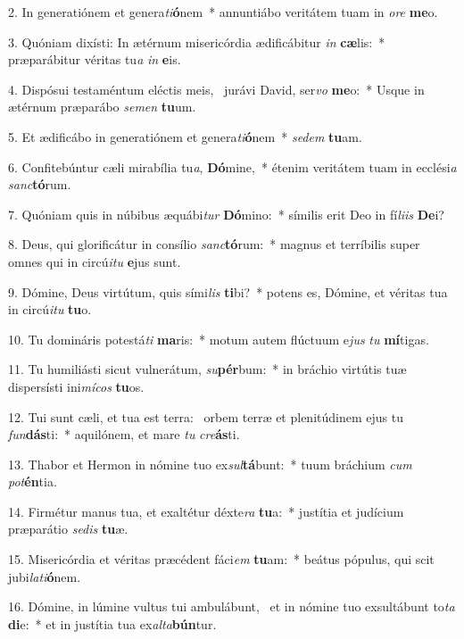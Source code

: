 2. In generatiónem et genera\textit{ti}\textbf{ó}nem~*  annuntiábo veritátem tuam in \textit{o}\textit{re} \textbf{me}o.\

3. Quóniam dixísti: In ætérnum misericórdia ædificábitur \textit{in} \textbf{cæ}lis:~*  præparábitur véritas tu\textit{a} \textit{in} \textbf{e}is.\

4. Dispósui testaméntum eléctis meis, \dag\  jurávi David, ser\textit{vo} \textbf{me}o:~*  Usque in ætérnum præparábo \textit{se}\textit{men} \textbf{tu}um.\

5. Et ædificábo in generatiónem et genera\textit{ti}\textbf{ó}nem~*  \textit{se}\textit{dem} \textbf{tu}am.\

6. Confitebúntur cæli mirabília tu\textit{a}, \textbf{Dó}mine,~*  étenim veritátem tuam in ecclési\textit{a} \textit{sanc}\textbf{tó}rum.\

7. Quóniam quis in núbibus æquábi\textit{tur} \textbf{Dó}mino:~*  símilis erit Deo in fí\textit{li}\textit{is} \textbf{De}i?\

8. Deus, qui glorificátur in consílio \textit{sanc}\textbf{tó}rum:~*  magnus et terríbilis super omnes qui in circú\textit{i}\textit{tu} \textbf{e}jus sunt.\

9. Dómine, Deus virtútum, quis sími\textit{lis} \textbf{ti}bi?~*  potens es, Dómine, et véritas tua in circú\textit{i}\textit{tu} \textbf{tu}o.\

10. Tu domináris potestá\textit{ti} \textbf{ma}ris:~*  motum autem flúctuum e\textit{jus} \textit{tu} \textbf{mí}tigas.\

11. Tu humiliásti sicut vulnerátum, \textit{su}\textbf{pér}bum:~*  in bráchio virtútis tuæ dispersísti ini\textit{mí}\textit{cos} \textbf{tu}os.\

12. Tui sunt cæli, et tua est terra: \dag\  orbem terræ et plenitúdinem ejus tu \textit{fun}\textbf{dás}ti:~*  aquilónem, et mare \textit{tu} \textit{cre}\textbf{ás}ti.\

13. Thabor et Hermon in nómine tuo ex\textit{sul}\textbf{tá}bunt:~*  tuum bráchium \textit{cum} \textit{pot}\textbf{én}tia.\

14. Firmétur manus tua, et exaltétur déxte\textit{ra} \textbf{tu}a:~*  justítia et judícium præparátio \textit{se}\textit{dis} \textbf{tu}æ.\

15. Misericórdia et véritas præcédent fáci\textit{em} \textbf{tu}am:~*  beátus pópulus, qui scit jubi\textit{la}\textit{ti}\textbf{ó}nem.\

16. Dómine, in lúmine vultus tui ambulábunt, \dag\  et in nómine tuo exsultábunt to\textit{ta} \textbf{di}e:~*  et in justítia tua ex\textit{al}\textit{ta}\textbf{bún}tur.\

